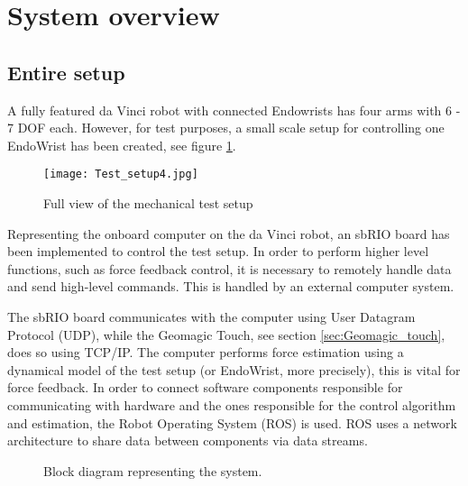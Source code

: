 \section{System overview}\label{sec:system_overview}

\subsection{Entire setup}

A fully featured da Vinci robot with connected Endowrists has four arms with 6 - 7 DOF each. 
However, for test purposes, a small scale setup for controlling one EndoWrist has been created, see figure \ref{fig:Mec_d}.

\begin{figure}
    \centering
    \texttt{[image: Test\_setup4.jpg]}
    \caption{Full view of the mechanical test setup}
    \label{fig:Mec_d}
\end{figure}

Representing the onboard computer on the da Vinci robot, an sbRIO board has been implemented to control the test setup. 
In order to perform higher level functions, such as force feedback control, it is necessary to remotely handle data and send high-level commands.
This is handled by an external computer system. %

The sbRIO board communicates with the computer using User Datagram Protocol (UDP), while the Geomagic Touch, see section \ref{sec:Geomagic_touch}, does so using TCP/IP.
The computer performs force estimation using a dynamical model of the test setup (or EndoWrist, more precisely), this is vital for force feedback.
In order to connect software components responsible for communicating with hardware and the ones responsible for the control algorithm and estimation, the Robot Operating System (ROS) is used.
ROS uses a network architecture to share data between components via data streams.


\begin{figure}[h]
\centering
{}
\caption{Block diagram representing the system.}
\end{figure}


